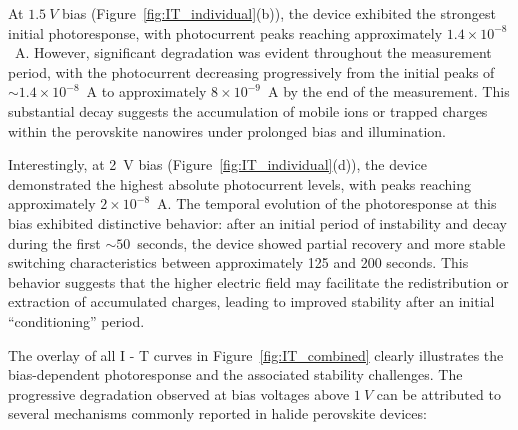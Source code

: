 \documentclass{rapportCS}
\begin{document}
	At $1.5~V$ bias (Figure~\ref{fig:IT_individual}(b)), the device exhibited the strongest initial photoresponse, with photocurrent peaks reaching approximately $1.4 \times 10^{-8}$~A. However, significant degradation was evident throughout the measurement period, with the photocurrent decreasing progressively from the initial peaks of $\sim 1.4 \times 10^{-8}$~A to approximately $8 \times 10^{-9}$~A by the end of the measurement. This substantial decay suggests the accumulation of mobile ions or trapped charges within the perovskite nanowires under prolonged bias and illumination.
	
	Interestingly, at 2~V bias (Figure~\ref{fig:IT_individual}(d)), the device demonstrated the highest absolute photocurrent levels, with peaks reaching approximately $2 \times 10^{-8}$~A. The temporal evolution of the photoresponse at this bias exhibited distinctive behavior: after an initial period of instability and decay during the first $\sim 50$~seconds, the device showed partial recovery and more stable switching characteristics between approximately 125 and 200 seconds. This behavior suggests that the higher electric field may facilitate the redistribution or extraction of accumulated charges, leading to improved stability after an initial ``conditioning'' period.
	
	The overlay of all I - T curves in Figure~\ref{fig:IT_combined} clearly illustrates the bias-dependent photoresponse and the associated stability challenges. The progressive degradation observed at bias voltages above $1~V$ can be attributed to several mechanisms commonly reported in halide perovskite devices:
	
\end{document}
